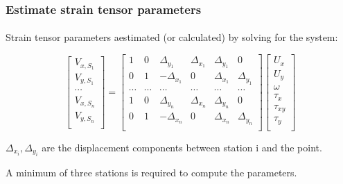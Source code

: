 \begin{frame}
 \frametitle{Estimate strain tensor parameters}
 \framesubtitle{}
 \label{ch2:}
 
 Strain tensor parameters aestimated (or calculated) by solving for the system:
 
 \[
  \begin{bmatrix}
    V_{x,S_1} \\ 
    V_{y,S_1} \\ 
    \cdots \\ 
    V_{x,S_n} \\ 
    V_{y,S_n} \\ 
  \end{bmatrix}
  =
  \begin{bmatrix}
    1 & 0 & \Delta_{y_1}  & \Delta_{x_1} & \Delta_{y_1} & 0 \\
    0 & 1 & -\Delta_{x_1} &  0           & \Delta_{x_1} & \Delta_{y_1} \\
    \cdots & \cdots & \cdots & \cdots & \cdots & \cdots \\
    1 & 0 & \Delta_{y_n}  & \Delta_{x_n} & \Delta_{y_n} & 0 \\
    0 & 1 & -\Delta_{x_n} &  0           & \Delta_{x_n} & \Delta_{y_n} \\
  \end{bmatrix}
  \begin{bmatrix}
    U_{x} \\ 
    U_{y} \\ 
    \omega \\ 
    \tau_{x} \\ 
    \tau_{xy} \\ 
    \tau_{y} \\ 
  \end{bmatrix}
  \]
  
  $\Delta_{x_i}, \Delta_{y_i}$ are the displacement components between station i and the point.
  
  A minimum of three stations is required to compute the parameters.
  

\end{frame}
\note{}

